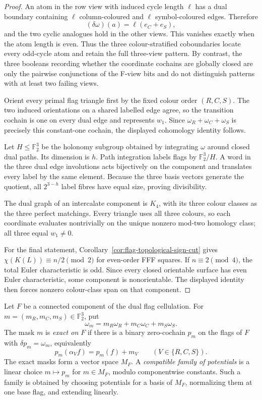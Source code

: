 \begin{proof}
An atom in the row view with induced cycle length $\ell$ has a dual boundary
containing $\ell$ column-coloured and $\ell$ symbol-coloured edges.  Therefore
\[
 (\delta\omega)(a)=\ell(e_C+e_S),
\]
and the two cyclic analogues hold in the other views.  This vanishes exactly
when the atom length is even.  Thus the three colour-stratified coboundaries
locate every odd-cycle atom and retain the full three-view pattern.  By
contrast, the three booleans recording whether the coordinate cochains are
globally closed are only the pairwise conjunctions of the F-view bits and do
not distinguish patterns with at least two failing views.

Orient every primal flag triangle first by the fixed colour order $(R,C,S)$.
The two induced orientations on a shared labelled edge agree, so the
transition cochain is one on every dual edge and represents $w_1$.  Since
$\omega_R+\omega_C+\omega_S$ is precisely this constant-one cochain, the
displayed cohomology identity follows.

Let $H\leq\mathbb F_2^3$ be the holonomy subgroup obtained by integrating
$\omega$ around closed dual paths.  Its dimension is $h$.  Path integration
labels flags by $\mathbb F_2^3/H$.  A word in the three dual edge involutions
acts bijectively on the component and translates every label by the same
element.  Because the three basis vectors generate the quotient, all
$2^{3-h}$ label fibres have equal size, proving divisibility.

The dual graph of an intercalate component is $K_4$, with its three colour
classes as the three perfect matchings.  Every triangle uses all three
colours, so each coordinate evaluates nontrivially on the unique nonzero
mod-two homology class; all three equal $w_1\ne0$.

For the final statement, Corollary~\ref{cor:flag-topological-sign-cut} gives
$\chi(K(L))\equiv n/2\pmod2$ for even-order FFF squares.  If
$n\equiv2\pmod4$, the total Euler characteristic is odd.  Since every closed
orientable surface has even Euler characteristic, some component is
nonorientable.  The displayed identity then forces nonzero colour-class
span on that component.
\end{proof}

\begin{definition}
\label{def:exact-mask-potentials}
Let $F$ be a connected component of the dual flag cellulation.  For
$m=(m_R,m_C,m_S)\in\mathbb F_2^3$, put
\[
 \omega_m=m_R\omega_R+m_C\omega_C+m_S\omega_S.
\]
The mask $m$ is \emph{exact on $F$} if there is a binary zero-cochain $p_m$
on the flags of $F$ with $\delta p_m=\omega_m$, equivalently
\[
 p_m(\alpha_Vf)=p_m(f)+m_V
 \qquad(V\in\{R,C,S\}).
\]
The exact masks form a vector space $M_F$.  A \emph{compatible family of
potentials} is a linear choice $m\mapsto p_m$ for $m\in M_F$, modulo
componentwise constants.  Such a family is obtained by choosing potentials
for a basis of $M_F$, normalizing them at one base flag, and extending
linearly.
\end{definition}

